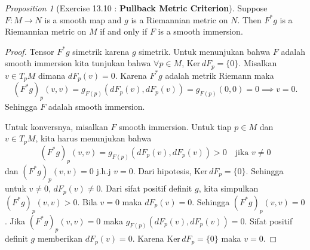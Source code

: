 \documentclass[a4paper]{article}
\theoremstyle{remark}
\newtheorem{prop}{Proposition}
\begin{document}
\begin{prop}[Exercise 13.10 :  \textbf{Pullback Metric Criterion}]
Suppose $F : M \rightarrow N$ is a smooth map and $g$ is a Riemannian metric on $N$. Then $F^*g$ is a Riemannian metric on $M$ if and only if $F$ is a smooth immersion.
\end{prop}
\begin{proof}
Tensor $F^*g$ simetrik karena $g$ simetrik. Untuk menunjukan bahwa $F$ adalah smooth immersion kita tunjukan bahwa $\forall p \in M$, $\text{Ker}\,dF_p = \{0\}$. Misalkan $v \in T_pM$ dimana $dF_p(v) = 0$. Karena $F^*g$ adalah metrik Riemann maka
$$
(F^*g)_p(v,v)  = g_{F(p)} (dF_p(v),dF_p(v)) = g_{F(p)} (0,0) = 0 \implies v=0.
$$ 
Sehingga $F$ adalah smooth immersion. 

Untuk konversnya, misalkan $F$ smooth immersion. Untuk tiap $p\in M$ dan $v \in T_pM$, kita harus menunjukan bahwa
$$
(F^*g)_p(v,v)  = g_{F(p)} (dF_p(v),dF_p(v)) > 0 \quad \text{jika } v \neq 0
$$
dan $(F^*g)_p(v,v) = 0$ j.h.j $v = 0$. Dari hipotesis, $\text{Ker}\,dF_p = \{0\}$. Sehingga untuk $v \neq 0$, $dF_p(v) \neq 0$. Dari sifat positif definit $g$, kita simpulkan $(F^*g)_p(v,v) > 0$. Bila $v=0$ maka $dF_p(v) = 0$. Sehingga $(F^*g)_p(v,v) = 0$. Jika $(F^*g)_p(v,v)= 0$ maka $g_{F(p)} (dF_p(v),dF_p(v)) = 0$. Sifat positif definit $g$ memberikan $dF_p(v) = 0$. Karena $\text{Ker}\,dF_p = \{0\}$ maka $v = 0$.
\end{proof}
\end{document}
